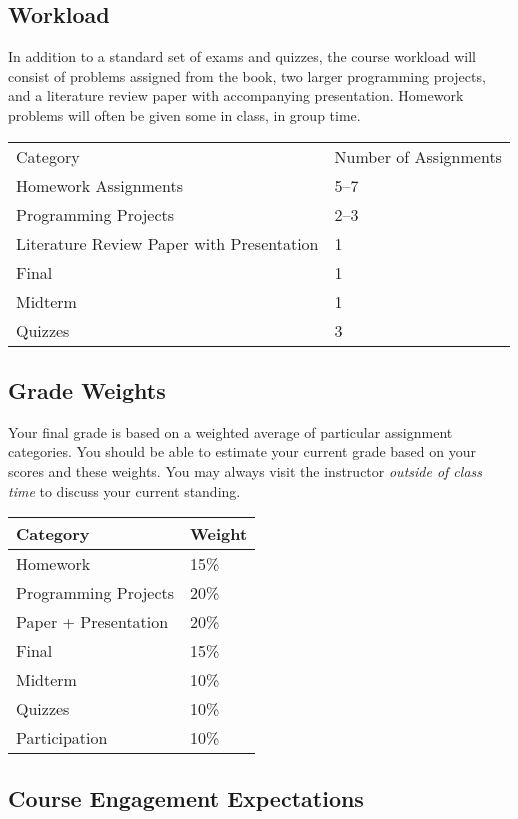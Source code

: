 \documentclass[10pt]{article}
\begin{document}
\subsection{Workload}

In addition to a standard set of exams and quizzes, the course workload will consist of problems assigned from the book, two larger programming projects, and a literature review paper with accompanying presentation. Homework problems will often be given some in class, in group time. 

\begin{center}
  \begin{tabular}{ll}
    Category & Number of Assignments \\
    Homework Assignments & 5--7 \\
    Programming Projects & 2--3 \\
    Literature Review Paper with Presentation & 1 \\
    Final & 1 \\
    Midterm & 1 \\
    Quizzes & 3
  \end{tabular}
\end{center}


\subsection{Grade Weights}

Your final grade is based on a weighted average of particular assignment categories.  You should be able to estimate your current grade based on your scores and these weights.  You may always visit the instructor \textit{outside of class time} to discuss your current standing.
\begin{center}
\begin{tabular}{ll}
  Category & Weight \\ \toprule
  Homework & 15\% \\
  Programming Projects  & 20\% \\
  Paper + Presentation & 20\% \\
  Final & 15\% \\
  Midterm & 10\% \\
  Quizzes & 10\% \\
  Participation & 10\%
\end{tabular}
\end{center}


\subsection{Course Engagement Expectations}
\end{document}
